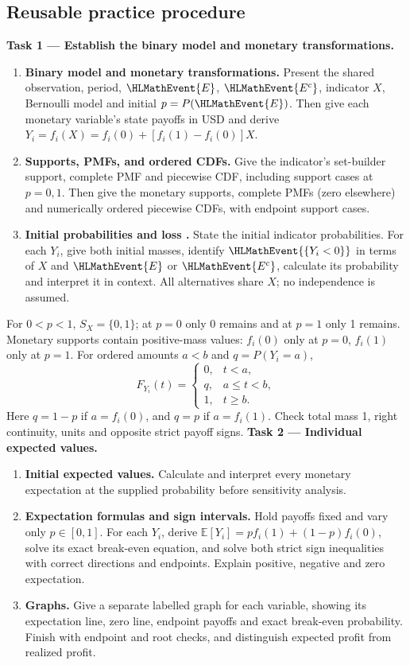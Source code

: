 \clearpage{}\subsection{Reusable practice procedure}
\textbf{Task 1 --- Establish the binary model and monetary transformations.}
\begin{enumerate}
\item \textbf{Binary model and monetary transformations.} Present the shared observation, period,  $\HLMathEvent{E}$,  $\HLMathEvent{E^c}$, indicator $X$, Bernoulli model and initial $p=P(\HLMathEvent{E})$. Then give each monetary variable's state payoffs in USD and derive $Y_i=f_i(X)=f_i(0)+[f_i(1)-f_i(0)]X$.
\item \textbf{Supports, PMFs, and ordered CDFs.} Give the indicator's set-builder support, complete PMF and piecewise CDF, including support cases at $p=0,1$. Then give the monetary supports, complete PMFs (zero elsewhere) and numerically ordered piecewise CDFs, with endpoint support cases.
\item \textbf{Initial probabilities and loss .} State the initial indicator probabilities. For each $Y_i$, give both initial masses, identify $\HLMathEvent{\{Y_i<0\}}$ in terms of $X$ and $\HLMathEvent{E}$ or $\HLMathEvent{E^c}$, calculate its probability and interpret it in context. All alternatives share $X$; no independence is assumed.
\end{enumerate}
For $0<p<1$, $S_X=\{0,1\}$; at $p=0$ only 0 remains and at $p=1$ only 1 remains.
Monetary supports contain positive-mass values: $f_i(0)$ only at $p=0$, $f_i(1)$ only at $p=1$.
For ordered amounts $a<b$ and $q=P(Y_i=a)$,
\[
F_{Y_i}(t)=\begin{cases}0,&t<a,\\q,&a\leq t<b,\\1,&t\geq b.\end{cases}
\]
Here $q=1-p$ if $a=f_i(0)$, and $q=p$ if $a=f_i(1)$.
Check total mass 1, right continuity, units and opposite strict payoff signs.
\textbf{Task 2 --- Individual expected values.}
\begin{enumerate}
\item \textbf{Initial expected values.} Calculate and interpret every monetary expectation at the supplied probability before sensitivity analysis.
\item \textbf{Expectation formulas and sign intervals.} Hold payoffs fixed and vary only $p\in\left[0,1\right]$. For each $Y_i$, derive $\mathbb E[Y_i]=p f_i(1)+(1-p)f_i(0)$, solve its exact break-even equation, and solve both strict sign inequalities with correct directions and endpoints. Explain positive, negative and zero expectation.
\item \textbf{Graphs.} Give a separate labelled graph for each variable, showing its expectation line, zero line, endpoint payoffs and exact break-even probability. Finish with endpoint and root checks, and distinguish expected profit from realized profit.
\end{enumerate}
